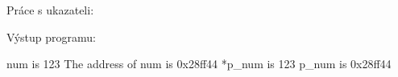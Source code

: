 \begin{mdframed}[style=mdexam]
  \begin{example}\label{cpp:exam009}
    Práce s ukazateli:
    
    Výstup programu:
    \begin{mdframed}[style=mdmsdos]
      num is 123  \newline
      The address of num is 0x28ff44 \newline
      *p\_num is 123 \newline
      p\_num is 0x28ff44 \newline
    \end{mdframed}
\end{example}
\end{mdframed}